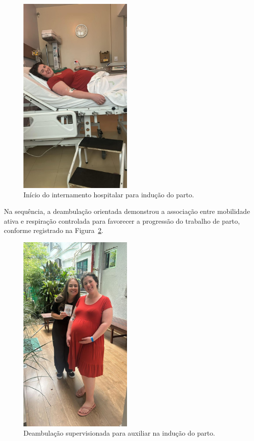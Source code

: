 \documentclass[openright]{tex/estilos/normas-utf-tex}
\begin{document}
\begin{figure}[H]
    \centering
    \includegraphics[width=0.5\textwidth]{assets/imagens/IMG_0756.JPG}
    \caption{Início do internamento hospitalar para indução do parto.}
    \label{fig:inicio-internamento}
\end{figure}

Na sequência, a deambulação orientada demonstrou a associação entre mobilidade ativa e respiração controlada para favorecer a progressão do trabalho de parto, conforme registrado na Figura~\ref{fig:deambulacao-inducao}.

\begin{figure}[H]
    \centering
    \includegraphics[width=0.5\textwidth]{assets/imagens/IMG_0757.JPG}
    \caption{Deambulação supervisionada para auxiliar na indução do parto.}
    \label{fig:deambulacao-inducao}
\end{figure}
\end{document}
